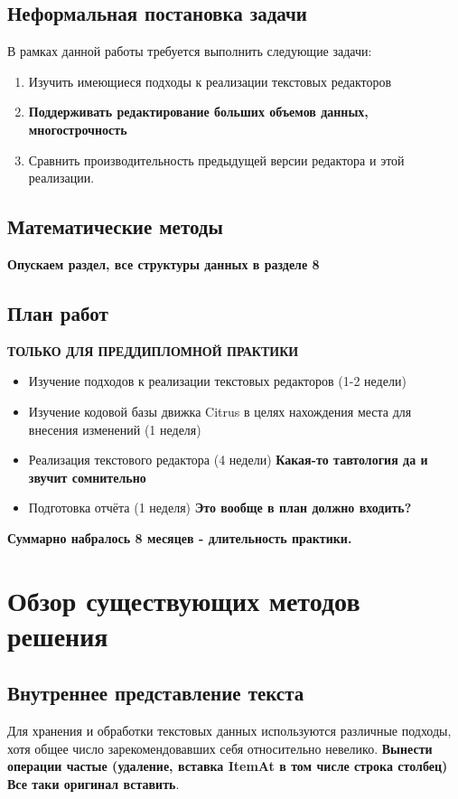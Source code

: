 \documentclass{fefu}
\begin{document}
		\subsection{Неформальная постановка задачи}
			В рамках данной работы требуется выполнить следующие задачи:
			\begin{enumerate}
				\item Изучить имеющиеся подходы к реализации текстовых редакторов
				\item \textbf{Поддерживать редактирование больших объемов данных, многострочность
				}
				\item Сравнить производительность предыдущей версии редактора и этой 
				реализации.
			\end{enumerate}
		\subsection{Математические методы}
			\textbf{Опускаем раздел, все структуры данных в разделе 8}	
		\subsection{План работ}
			\par \textbf{ТОЛЬКО ДЛЯ ПРЕДДИПЛОМНОЙ ПРАКТИКИ}
			\begin{itemize}
				\item Изучение подходов к реализации текстовых редакторов (1-2 недели)
				\item Изучение кодовой базы движка Citrus в целях нахождения места для внесения
				изменений (1 неделя)
				\item Реализация текстового редактора (4 недели) \textbf{Какая-то тавтология 
				да и звучит сомнительно}
				\item Подготовка отчёта (1 неделя) \textbf{Это вообще в план должно входить?}
			\end{itemize}
			\textbf{Суммарно набралось 8 месяцев - длительность практики.}
	\section{Обзор существующих методов решения}
		\subsection{Внутреннее представление текста}
			\par Для хранения и обработки текстовых данных используются различные подходы,
				хотя общее число зарекомендовавших себя относительно невелико.
				\textbf{Вынести операции частые (удаление, вставка ItemAt в том числе строка столбец)}
				\cite{TextEditorDataStructures} \textbf{Все таки оригинал вставить}.
\end{document}
